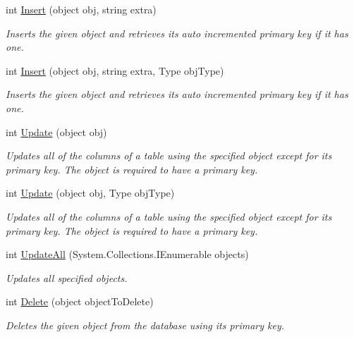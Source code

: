 \begin{DoxyCompactItemize}
int \hyperlink{classSQLite_1_1SQLiteConnection_a3ab0fde4b10c4b492b2f5f64535c6d66}{Insert} (object obj, string extra)
\begin{DoxyCompactList}\small\item\em Inserts the given object and retrieves its auto incremented primary key if it has one. \end{DoxyCompactList}\item 
int \hyperlink{classSQLite_1_1SQLiteConnection_ab88782cd2d5c77bb14d6a17baf7c49bc}{Insert} (object obj, string extra, Type obj\+Type)
\begin{DoxyCompactList}\small\item\em Inserts the given object and retrieves its auto incremented primary key if it has one. \end{DoxyCompactList}\item 
int \hyperlink{classSQLite_1_1SQLiteConnection_ae4effee772569a47256bcb5f8764eabc}{Update} (object obj)
\begin{DoxyCompactList}\small\item\em Updates all of the columns of a table using the specified object except for its primary key. The object is required to have a primary key. \end{DoxyCompactList}\item 
int \hyperlink{classSQLite_1_1SQLiteConnection_ab474a534faebfec1288672ef4e4f2140}{Update} (object obj, Type obj\+Type)
\begin{DoxyCompactList}\small\item\em Updates all of the columns of a table using the specified object except for its primary key. The object is required to have a primary key. \end{DoxyCompactList}\item 
int \hyperlink{classSQLite_1_1SQLiteConnection_a1a95399fe5d61f8bbb56e36eac38d467}{Update\+All} (System.\+Collections.\+I\+Enumerable objects)
\begin{DoxyCompactList}\small\item\em Updates all specified objects. \end{DoxyCompactList}\item 
int \hyperlink{classSQLite_1_1SQLiteConnection_a55234164e36bc4abcb086e197f25e436}{Delete} (object object\+To\+Delete)
\begin{DoxyCompactList}\small\item\em Deletes the given object from the database using its primary key. \end{DoxyCompactList}\item 

\end{DoxyCompactItemize}
